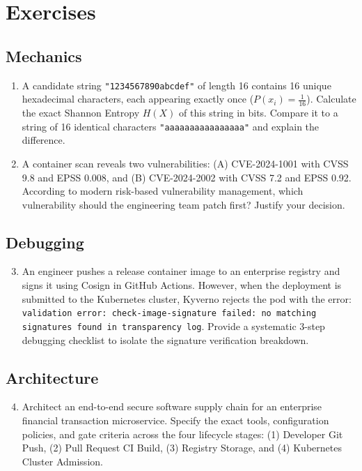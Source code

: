 \section{Exercises}

\subsection{Mechanics}
\begin{enumerate}[leftmargin=18pt]
  \item A candidate string \texttt{"1234567890abcdef"} of length 16 contains 16 unique hexadecimal characters, each appearing exactly once ($P(x_i) = \frac{1}{16}$). Calculate the exact Shannon Entropy $H(X)$ of this string in bits. Compare it to a string of 16 identical characters \texttt{"aaaaaaaaaaaaaaaa"} and explain the difference.
  \item A container scan reveals two vulnerabilities: (A) CVE-2024-1001 with CVSS 9.8 and EPSS 0.008, and (B) CVE-2024-2002 with CVSS 7.2 and EPSS 0.92. According to modern risk-based vulnerability management, which vulnerability should the engineering team patch first? Justify your decision.
\end{enumerate}

\subsection{Debugging}
\begin{enumerate}[leftmargin=18pt]
  \setcounter{enumi}{2}
  \item An engineer pushes a release container image to an enterprise registry and signs it using Cosign in GitHub Actions. However, when the deployment is submitted to the Kubernetes cluster, Kyverno rejects the pod with the error: \texttt{validation error: check-image-signature failed: no matching signatures found in transparency log}. Provide a systematic 3-step debugging checklist to isolate the signature verification breakdown.
\end{enumerate}

\subsection{Architecture}
\begin{enumerate}[leftmargin=18pt]
  \setcounter{enumi}{3}
  \item Architect an end-to-end secure software supply chain for an enterprise financial transaction microservice. Specify the exact tools, configuration policies, and gate criteria across the four lifecycle stages: (1) Developer Git Push, (2) Pull Request CI Build, (3) Registry Storage, and (4) Kubernetes Cluster Admission.
\end{enumerate}

